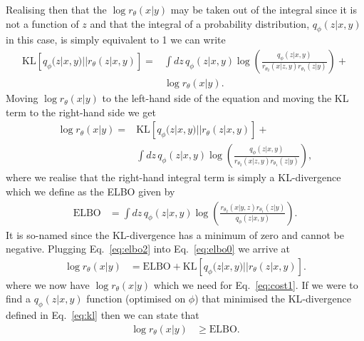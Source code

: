 %
Realising then that the $\log r_{\theta}(x|y)$ may be taken out of the integral since it is 
not a function of $z$ and that the integral of a probability distribution, $q_{\phi}(z|x,y)$ in 
this case, is simply equivalent to 1 we can write
%
\begin{align}
    \text{KL}\left[q_{\phi}(z|x,y)||r_{\theta}(z|x,y)\right] =
    &\int dz\,q_{\phi}(z|x,y)
    \log\left(\frac{q_{\phi}(z|x,y)}{r_{\theta_2}(x|z,y) r_{\theta_1}(z|y)}\right) + \nonumber \\ 
    &\log r_{\theta}(x|y). \nonumber
\end{align}
%
Moving $\log r_{\theta}(x|y)$ to the left-hand side of the equation and moving 
the \ac{KL} term to the right-hand side we get 
%
\begin{align}\label{eq:elbo0}
    \log r_{\theta}(x|y) = &\text{KL}\left[q_{\phi}(z|x,y)||r_{\theta}(z|x,y)\right] + \nonumber \\
    &\int dz\,q_{\phi}(z|x,y)
    \log\left(\frac{q_{\phi}(z|x,y)}{r_{\theta_2}(x|z,y) r_{\theta_1}(z|y)}\right), 
\end{align}
%
where we realise that the right-hand integral term is simply a \ac{KL}-divergence which 
we define as the \ac{ELBO} given by
%
\begin{align}\label{eq:elbo2}
\text{ELBO} &= \int dz\,
q_{\phi}(z|x,y)\log\left(\frac{r_{\theta_{2}}(x|y,z)r_{\theta_{1}}(z|y)}{q_{\phi}(z|x,y)}\right).
\end{align}
%
It is so-named since the \ac{KL}-divergence has a minimum of zero and cannot be negative. Plugging 
Eq.~\ref{eq:elbo2} into Eq.~\ref{eq:elbo0} we arrive at
%
\begin{align}\label{eq:elbo1}
\log r_{\theta}(x|y) &= \text{ELBO} + \text{KL}\left[q_{\phi}(z|x,y)||r_{\theta}(z|x,y)\right].
\end{align}
%
where we now have $\log r_{\theta}(x|y)$ which we need for Eq.~\ref{eq:cost1}. 
If we were to find a $q_{\phi}(z|x,y)$ function (optimised on $\phi$) that minimised the \ac{KL}-divergence defined in Eq.~\ref{eq:kl} then we can state that
%
\begin{align}\label{eq:r_theta_ineq1}
\log r_{\theta}(x|y) &\geq \text{ELBO}.
\end{align}
%
~ 
